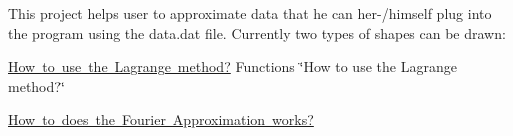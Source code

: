This project helps user to approximate data that he can her-\//himself plug into the program using the data.\+dat file. Currently two types of shapes can be drawn\+:
\begin{DoxyItemize}
\item \mbox{\hyperlink{LagrangePolynomial}{How to use the Lagrange method?}} Functions \char`\"{}\+How to use the Lagrange method?\char`\"{}
\item \mbox{\hyperlink{FourierTransforms}{How to does the Fourier Approximation works?}} 
\end{DoxyItemize}